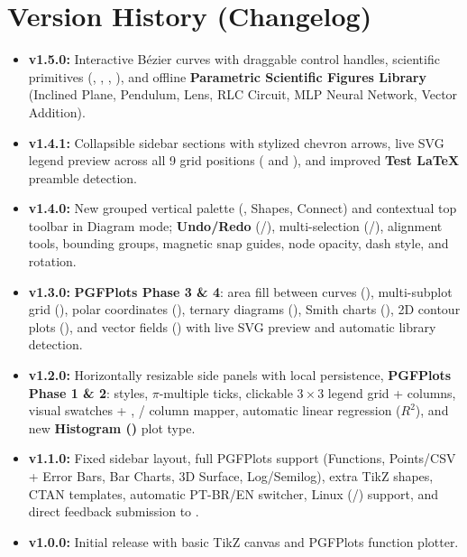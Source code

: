 \documentclass[11pt,a4paper]{article}
\begin{document}
\section{Version History (Changelog)}
\begin{itemize}
  \item \textbf{v1.5.0:} Interactive Bézier curves with draggable control handles, scientific primitives (, , , ), and offline \textbf{Parametric Scientific Figures Library} (Inclined Plane, Pendulum, Lens, RLC Circuit, MLP Neural Network, Vector Addition).
  \item \textbf{v1.4.1:} Collapsible sidebar sections with stylized chevron arrows, live SVG legend preview across all 9 grid positions ( and ), and improved \textbf{Test LaTeX} preamble detection.
  \item \textbf{v1.4.0:} New grouped vertical palette (, Shapes, Connect) and contextual top toolbar in Diagram mode; \textbf{Undo/Redo} (/), multi-selection (/), alignment tools,  bounding groups, magnetic snap guides, node opacity, dash style, and rotation.
  \item \textbf{v1.3.0:} \textbf{PGFPlots Phase 3 \& 4}: area fill between curves (), multi-subplot grid (), polar coordinates (), ternary diagrams (), Smith charts (), 2D contour plots (), and vector fields () with live SVG preview and automatic library detection.
  \item \textbf{v1.2.0:} Horizontally resizable side panels with local persistence, \textbf{PGFPlots Phase 1 \& 2}:  styles, $\pi$-multiple ticks, clickable $3 \times 3$ legend grid + columns, visual  swatches + , / column mapper, automatic linear regression ($R^2$), and new \textbf{Histogram ()} plot type.
  \item \textbf{v1.1.0:} Fixed sidebar layout, full PGFPlots support (Functions, Points/CSV + Error Bars, Bar Charts, 3D Surface, Log/Semilog), extra TikZ shapes, CTAN templates, automatic PT-BR/EN switcher, Linux (/) support, and direct feedback submission to .
  \item \textbf{v1.0.0:} Initial release with basic TikZ canvas and PGFPlots function plotter.
\end{itemize}
\end{document}
